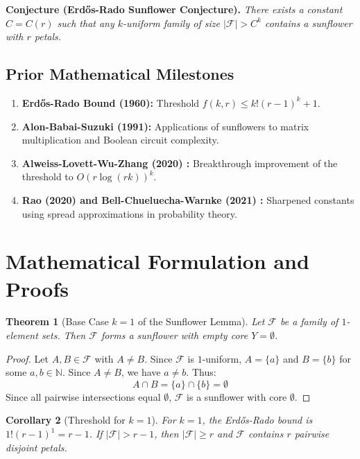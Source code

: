 \documentclass[11pt,a4paper]{article}
\newtheorem{theorem}{Theorem}[section]
\newtheorem{corollary}[theorem]{Corollary}
\theoremstyle{definition}
\begin{document}
\noindent\textbf{Conjecture (Erd\H{o}s-Rado Sunflower Conjecture).} \textit{There exists a constant $C = C(r)$ such that any $k$-uniform family of size $|\mathcal{F}| > C^k$ contains a sunflower with $r$ petals.}

\subsection{Prior Mathematical Milestones}
\begin{enumerate}
    \item \textbf{Erd\H{o}s-Rado Bound (1960):} Threshold $f(k, r) \le k!(r-1)^k + 1$.
    \item \textbf{Alon-Babai-Suzuki (1991):} Applications of sunflowers to matrix multiplication and Boolean circuit complexity.
    \item \textbf{Alweiss-Lovett-Wu-Zhang (2020) \cite{alweiss2020}:} Breakthrough improvement of the threshold to $O(r \log(rk))^k$.
    \item \textbf{Rao (2020) and Bell-Chueluecha-Warnke (2021) \cite{bell2021}:} Sharpened constants using spread approximations in probability theory.
\end{enumerate}

\section{Mathematical Formulation and Proofs}

\begin{theorem}[Base Case $k=1$ of the Sunflower Lemma]\label{thm:k1}
Let $\mathcal{F}$ be a family of $1$-element sets. Then $\mathcal{F}$ forms a sunflower with empty core $Y = \emptyset$.
\end{theorem}

\begin{proof}
Let $A, B \in \mathcal{F}$ with $A \ne B$.
Since $\mathcal{F}$ is $1$-uniform, $A = \{a\}$ and $B = \{b\}$ for some $a, b \in \mathbb{N}$.
Since $A \ne B$, we have $a \ne b$.
Thus:
\[ A \cap B = \{a\} \cap \{b\} = \emptyset \]
Since all pairwise intersections equal $\emptyset$, $\mathcal{F}$ is a sunflower with core $\emptyset$.
\end{proof}

\begin{corollary}[Threshold for $k=1$]\label{cor:k1_thresh}
For $k=1$, the Erd\H{o}s-Rado bound is $1!(r-1)^1 = r-1$.
If $|\mathcal{F}| > r-1$, then $|\mathcal{F}| \ge r$ and $\mathcal{F}$ contains $r$ pairwise disjoint petals.
\end{corollary}
\end{document}
